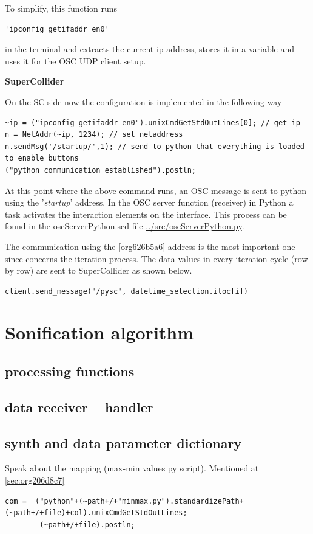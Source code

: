 \documentclass[11pt]{article}
\begin{document}
To simplify, this function runs
\begin{verbatim}
'ipconfig getifaddr en0'
\end{verbatim}
in the terminal and extracts the current ip address, stores it in a variable and uses it for the OSC UDP client setup.

\textbf{SuperCollider}

On the SC side now the configuration is implemented in the following way
\begin{verbatim}
~ip = ("ipconfig getifaddr en0").unixCmdGetStdOutLines[0]; // get ip
n = NetAddr(~ip, 1234); // set netaddress
n.sendMsg('/startup/',1); // send to python that everything is loaded to enable buttons
("python communication established").postln;
\end{verbatim}

At this point where the above command runs, an OSC message is sent to python using the '\emph{startup}' address.  In the OSC server function (receiver) in Python a task activates the interaction elements on the interface.  This process can be found in the oscServerPython.scd file \url{../src/oscServerPython.py}.

The communication using the \ref{org626b5a6} address is the most important one since concerns the iteration process.  The data values in every iteration cycle (row by row) are sent to SuperCollider as shown below.

\begin{verbatim}
client.send_message("/pysc", datetime_selection.iloc[i])
\end{verbatim}
\section{Sonification algorithm}
\label{sec:org13f233f}
\subsection{processing functions}
\label{sec:org4b31ca5}
\subsection{data receiver -- handler}
\label{sec:org5ab6084}
\subsection{synth and data parameter dictionary}
\label{sec:org58a921a}
Speak about the mapping (max-min values py script).  Mentioned at \ref{sec:org206d8c7}
\begin{verbatim}
com =  ("python"+(~path+/+"minmax.py").standardizePath+(~path+/+file)+col).unixCmdGetStdOutLines;
        (~path+/+file).postln;
\end{verbatim}
\end{document}
